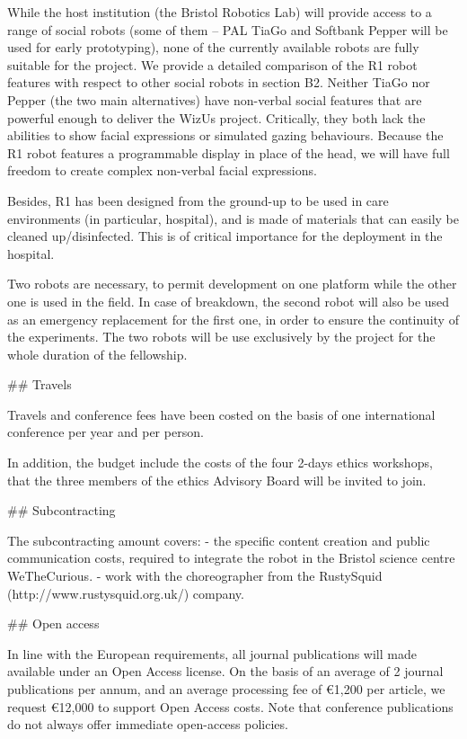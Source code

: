 \documentclass[11pt,a4paper]{report}
\begin{document}
While the host institution (the Bristol Robotics Lab) will provide access to a
range of social robots (some of them -- PAL TiaGo and Softbank Pepper will be
used for early prototyping), none of the currently available robots are fully
suitable for the project. We provide a detailed comparison of the R1 robot
features with respect to other social robots in section  B2. Neither TiaGo nor
Pepper (the two main alternatives) have non-verbal social features that are
powerful enough to deliver the WizUs project. Critically, they both lack the
abilities to show facial expressions or simulated gazing behaviours. Because the
R1 robot features a programmable display in place of the head, we will have full
freedom to create complex non-verbal facial expressions.

Besides, R1 has been designed from the ground-up to be used in care environments
(in particular, hospital), and is made of materials that can easily be cleaned
up/disinfected. This is of critical importance for the deployment in the
hospital.

Two robots are necessary, to permit development on one platform while the other
one is used in the field. In case of breakdown, the second robot will also be
used as an emergency replacement for the first one, in order to ensure the
continuity of the experiments. The two robots will be use exclusively by the
project for the whole duration of the fellowship.

## Travels

Travels and conference fees have been costed on the basis of one international
conference per year and per person.

In addition, the budget include the costs of the four 2-days ethics workshops,
that the three members of the ethics Advisory Board will be invited to join.

## Subcontracting

The subcontracting amount covers:
- the specific content creation and public communication costs, required to 
integrate the robot in the Bristol science centre WeTheCurious.
- work with the choreographer from the RustySquid
(http://www.rustysquid.org.uk/) company.

## Open access

In line with the European requirements, all journal publications will made
available under an Open Access license.  On the basis of an average of 2 journal
publications per annum, and an average processing fee of €1,200 per article, we
request €12,000 to support Open Access costs. Note that conference publications
do not always offer immediate open-access policies.
\end{document}
